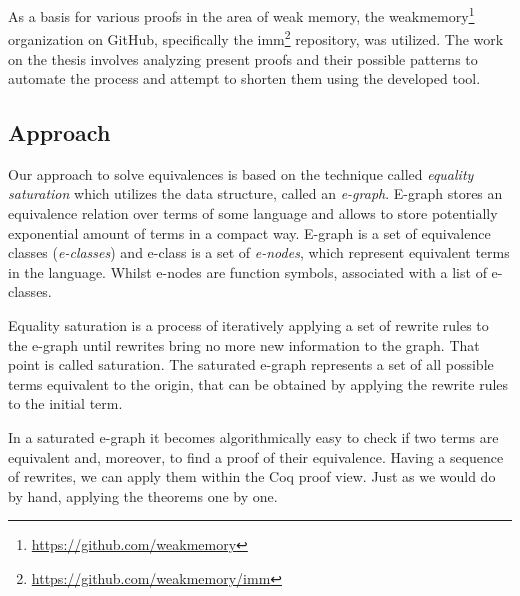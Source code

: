 As a basis for various proofs in the area of weak memory, the weakmemory\footnote{\href{https://github.com/weakmemory}{https://github.com/weakmemory}} organization on GitHub, specifically the imm\footnote{\href{https://github.com/weakmemory/imm}{https://github.com/weakmemory/imm}} repository, was utilized. The work on the thesis involves analyzing present proofs and their possible patterns to automate the process and attempt to shorten them using the developed tool.

\subsection{Approach}
Our approach to solve equivalences is based on the technique called \textit{equality saturation} which utilizes the data structure, called an \textit{e-graph}. E-graph stores an equivalence relation over terms of some language and allows to store potentially exponential amount of terms in a compact way. E-graph is a set of equivalence classes (\textit{e-classes}) and e-class is a set of \textit{e-nodes}, which represent equivalent terms in the language. Whilst e-nodes are function symbols, associated with a list of e-classes. 

Equality saturation is a process of iteratively applying a set of rewrite rules to the e-graph until rewrites bring no more new information to the graph. That point is called saturation. The saturated e-graph represents a set of all possible terms  equivalent to the origin, that can be obtained by applying the rewrite rules to the initial term.

In a saturated e-graph it becomes algorithmically easy to check if two terms are equivalent and, moreover, to find a proof of their equivalence. Having a sequence of rewrites, we can apply them within the Coq proof view. Just as we would do by hand, applying the theorems one by one.



